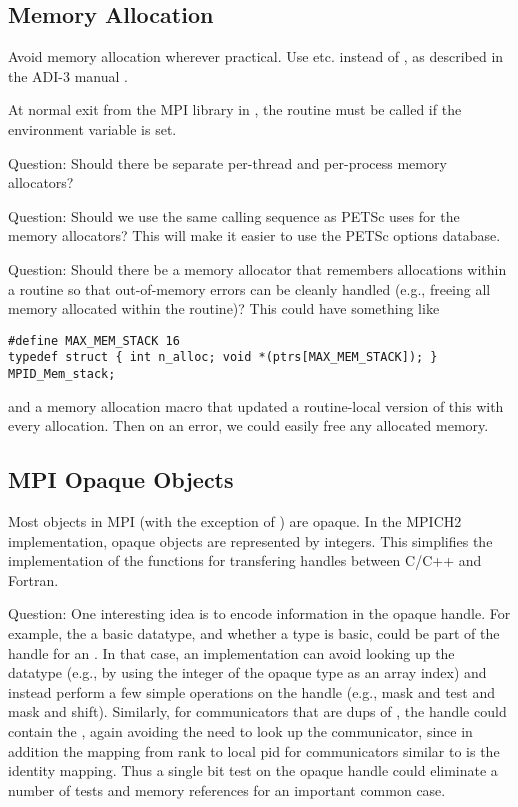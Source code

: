 \documentclass{article}
\begin{document}
\subsection{Memory Allocation}
Avoid memory allocation wherever practical.  Use 
etc. instead of , as described in the ADI-3 manual
\cite{adi3man}. 

At normal exit from the MPI library in , the
routine  must be called if the environment variable
 is set.  

Question: Should there be separate per-thread and per-process memory
allocators? 

Question: Should we use the same calling sequence as PETSc uses for the memory
allocators?  This will make it easier to use the PETSc options database.

Question: Should there be a memory allocator that remembers allocations within
a routine so that out-of-memory errors can be cleanly handled (e.g., freeing
all memory allocated within the routine)?  This could have something like
\begin{verbatim}
#define MAX_MEM_STACK 16
typedef struct { int n_alloc; void *(ptrs[MAX_MEM_STACK]); } MPID_Mem_stack;
\end{verbatim}
and a memory allocation macro that updated a routine-local version of this
with every allocation.  Then on an error, we could easily free any allocated
memory.

\subsection{MPI Opaque Objects}

Most objects in MPI (with the exception of ) are
opaque.  In the MPICH2 implementation, opaque objects are represented
by integers.  This simplifies the implementation of the functions for
transfering handles between C/C++ and Fortran.  

Question:  One interesting idea is to encode information in the opaque
handle.  For example, the  a basic datatype, and whether
a type is basic, could be part of the handle for an
. In that case, an implementation can avoid looking
up the datatype (e.g., by using the integer of the opaque type as an
array index) and instead perform a few simple operations on the handle
(e.g., mask and test and mask and shift).  Similarly, for
communicators that are dups of , the handle could
contain the , again avoiding the need to look up the
communicator, since in addition the mapping from rank to local pid for 
communicators similar to  is the identity
mapping.  Thus a single bit test on the opaque handle could eliminate
a number of tests and memory references for an important common case.
\end{document}

